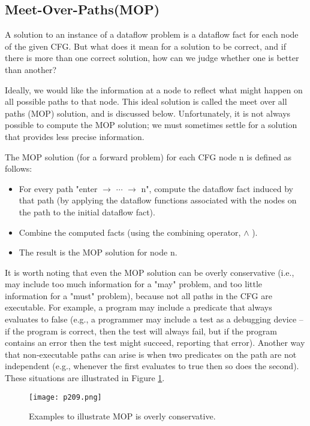 \subsection{Meet-Over-Paths(MOP)\cite{DATAFLOW66:online}}

A solution to an instance of a dataflow problem is a dataflow fact for each node of the given CFG. But what does it mean for a solution to be correct, and if there is more than one correct solution, how can we judge whether one is better than another?

Ideally, we would like the information at a node to reflect what might happen on all possible paths to that node. This ideal solution is called the meet over all paths (MOP) solution, and is discussed below. Unfortunately, it is not always possible to compute the MOP solution; we must sometimes settle for a solution that provides less precise information.


The MOP solution (for a forward problem) for each CFG node n is defined as follows:


\begin{itemize}
	\item For every path "enter $\rightarrow$  $\cdots$  $\rightarrow$ n", compute the dataflow fact induced by that path
	      (by applying the dataflow functions associated with the nodes on the path to the initial dataflow fact).
	\item Combine the computed facts (using the combining operator, $\wedge $ ).
	\item The result is the MOP solution for node n.

\end{itemize}


It is worth noting that even the MOP solution can be overly conservative
(i.e., may include too much information for a "may" problem, and too little information for a "must" problem),
because not all paths in the CFG are executable. For example, a program may include a predicate that always evaluates to false
(e.g., a programmer may include a test as a debugging device -- if the program is correct, then the test will always fail,
but if the program contains an error then the test might succeed, reporting that error). Another way that non-executable paths
can arise is when two predicates on the path are not independent (e.g., whenever the first evaluates to true then so does the second).
These situations are illustrated in Figure \ref{fig:p209}.



\begin{figure}[H]
	\centering
	\texttt{[image: p209.png]}
	\caption{Examples to illustrate MOP is overly conservative.}
	\label{fig:p209}
\end{figure}




